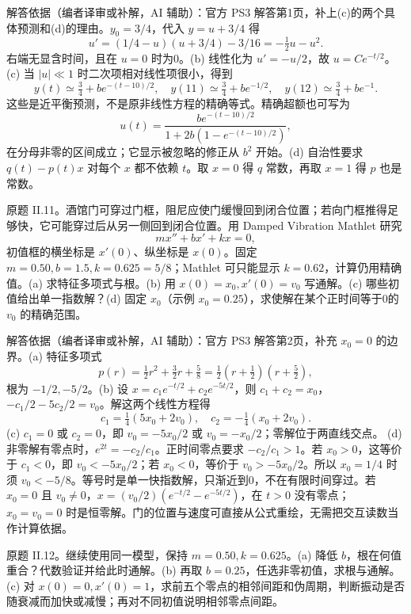 \begin{solution}
解答依据（编者译审或补解，AI 辅助）：官方 PS3 解答第1页，补上(c)的两个具体预测和(d)的理由。$y_0=3/4$，代入 $y=u+3/4$ 得
\[
 u'=(1/4-u)(u+3/4)-3/16=-\tfrac12u-u^2.
\]
右端无显含时间，且在 $u=0$ 时为0。(b) 线性化为 $u'=-u/2$，故 $u=Ce^{-t/2}$。(c) 当 $|u|\ll1$ 时二次项相对线性项很小，得到
\[
 y(t)\simeq\tfrac34+be^{-(t-10)/2},\quad
 y(11)\simeq\tfrac34+be^{-1/2},\quad y(12)\simeq\tfrac34+be^{-1}.
\]
这些是近平衡预测，不是原非线性方程的精确等式。精确超额也可写为
\[
 u(t)=\frac{be^{-(t-10)/2}}{1+2b(1-e^{-(t-10)/2})},
\]
在分母非零的区间成立；它显示被忽略的修正从 $b^2$ 开始。(d) 自治性要求 $q(t)-p(t)x$ 对每个 $x$ 都不依赖 $t$。取 $x=0$ 得 $q$ 常数，再取 $x=1$ 得 $p$ 也是常数。
\end{solution}
\begin{exercise}\label{cw:ps3-II-11}
原题 II.11。酒馆门可穿过门框，阻尼应使门缓慢回到闭合位置；若向门框推得足够快，它可能穿过后从另一侧回到闭合位置。用 Damped Vibration Mathlet 研究
\[
 mx''+bx'+kx=0,
\]
初值框的横坐标是 $x'(0)$、纵坐标是 $x(0)$。固定 $m=0.50,b=1.5,k=0.625=5/8$；Mathlet 可只能显示 $k=0.62$，计算仍用精确值。(a) 求特征多项式与根。(b) 用 $x(0)=x_0,x'(0)=v_0$ 写通解。(c) 哪些初值给出单一指数解？(d) 固定 $x_0$（示例 $x_0=0.25$），求使解在某个正时间等于0的 $v_0$ 的精确范围。
\end{exercise}
\begin{solution}
解答依据（编者译审或补解，AI 辅助）：官方 PS3 解答第2页，补充 $x_0=0$ 的边界。(a) 特征多项式
\[
 p(r)=\tfrac12r^2+\tfrac32r+\tfrac58
 =\tfrac12(r+\tfrac12)(r+\tfrac52),
\]
根为 $-1/2,-5/2$。(b) 设 $x=c_1e^{-t/2}+c_2e^{-5t/2}$，则 $c_1+c_2=x_0$，$-c_1/2-5c_2/2=v_0$。解这两个线性方程得
\[
 c_1=\tfrac14(5x_0+2v_0),\quad c_2=-\tfrac14(x_0+2v_0).
\]
(c) $c_1=0$ 或 $c_2=0$，即 $v_0=-5x_0/2$ 或 $v_0=-x_0/2$；零解位于两直线交点。
(d) 非零解有零点时，$e^{2t}=-c_2/c_1$。正时间零点要求 $-c_2/c_1>1$。若 $x_0>0$，这等价于 $c_1<0$，即 $v_0<-5x_0/2$；若 $x_0<0$，等价于 $v_0>-5x_0/2$。所以 $x_0=1/4$ 时须 $v_0<-5/8$。等号时是单一快指数解，只渐近到0，不在有限时间穿过。若 $x_0=0$ 且 $v_0\ne0$，$x=(v_0/2)(e^{-t/2}-e^{-5t/2})$，在 $t>0$ 没有零点；$x_0=v_0=0$ 时是恒零解。门的位置与速度可直接从公式重绘，无需把交互读数当作计算依据。
\end{solution}
\begin{exercise}\label{cw:ps3-II-12}
原题 II.12。继续使用同一模型，保持 $m=0.50,k=0.625$。(a) 降低 $b$，根在何值重合？代数验证并给此时通解。(b) 再取 $b=0.25$，任选非零初值，求根与通解。(c) 对 $x(0)=0,x'(0)=1$，求前五个零点的相邻间距和伪周期，判断振动是否随衰减而加快或减慢；再对不同初值说明相邻零点间距。
\end{exercise}

